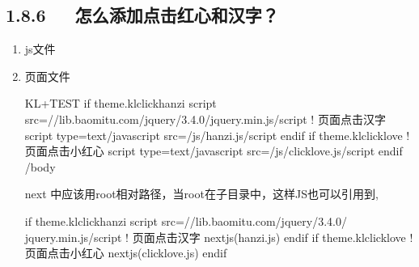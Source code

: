 \documentclass[letterpaper,12pt,english]{sphinxmanual}
\begin{document}
\subsection{1.8.6   怎么添加点击红心和汉字？}
\label{\detokenize{001software/001install/001._u7f51_u7ad9/hexo:id21}}\begin{enumerate}
%
\item {} 
js文件

\begin{sphinxVerbatim}[commandchars=\\\{\}]
\end{sphinxVerbatim}

\item {} 
页面文件

\begin{sphinxVerbatim}[commandchars=\\\{\}]
KL+TEST
\PYGZob{}\PYGZpc{}\PYGZhy{} if theme.kl\PYGZus{}click\PYGZus{}hanzi \PYGZpc{}\PYGZcb{}
      \PYGZlt{}script src=\PYGZdq{}//lib.baomitu.com/jquery/3.4.0/jquery.min.js\PYGZdq{}\PYGZgt{}\PYGZlt{}/script\PYGZgt{}
      \PYGZlt{}!\PYGZhy{}\PYGZhy{} 页面点击汉字 \PYGZhy{}\PYGZhy{}\PYGZgt{}
      \PYGZlt{}script type=\PYGZdq{}text/javascript\PYGZdq{} src=\PYGZdq{}/js/hanzi.js\PYGZdq{}\PYGZgt{}\PYGZlt{}/script\PYGZgt{}
\PYGZob{}\PYGZpc{}\PYGZhy{} endif \PYGZpc{}\PYGZcb{}
\PYGZob{}\PYGZpc{}\PYGZhy{} if theme.kl\PYGZus{}click\PYGZus{}love \PYGZpc{}\PYGZcb{}
      \PYGZlt{}!\PYGZhy{}\PYGZhy{} 页面点击小红心 \PYGZhy{}\PYGZhy{}\PYGZgt{}
      \PYGZlt{}script type=\PYGZdq{}text/javascript\PYGZdq{} src=\PYGZdq{}/js/clicklove.js\PYGZdq{}\PYGZgt{}\PYGZlt{}/script\PYGZgt{}
\PYGZob{}\PYGZpc{}\PYGZhy{} endif \PYGZpc{}\PYGZcb{}
\PYGZlt{}/body\PYGZgt{}
\end{sphinxVerbatim}

next 中应该用root相对路径，当root在子目录中，这样JS也可以引用到, 

\begin{sphinxVerbatim}[commandchars=\\\{\}]
\PYGZob{}\PYGZpc{}\PYGZhy{} if theme.kl\PYGZus{}click\PYGZus{}hanzi \PYGZpc{}\PYGZcb{}
      \PYGZlt{}script src=\PYGZdq{}//lib.baomitu.com/jquery/3.4.0/    jquery.min.js\PYGZdq{}\PYGZgt{}\PYGZlt{}/script\PYGZgt{}
      \PYGZlt{}!\PYGZhy{}\PYGZhy{} 页面点击汉字 \PYGZhy{}\PYGZhy{}\PYGZgt{}
      \PYGZob{}\PYGZob{}\PYGZhy{} next\PYGZus{}js(\PYGZsq{}hanzi.js\PYGZsq{}) \PYGZcb{}\PYGZcb{}
\PYGZob{}\PYGZpc{}\PYGZhy{} endif \PYGZpc{}\PYGZcb{}
\PYGZob{}\PYGZpc{}\PYGZhy{} if theme.kl\PYGZus{}click\PYGZus{}love \PYGZpc{}\PYGZcb{}
      \PYGZlt{}!\PYGZhy{}\PYGZhy{} 页面点击小红心 \PYGZhy{}\PYGZhy{}\PYGZgt{}
      \PYGZob{}\PYGZob{}\PYGZhy{} next\PYGZus{}js(\PYGZsq{}clicklove.js\PYGZsq{}) \PYGZcb{}\PYGZcb{}
\PYGZob{}\PYGZpc{}\PYGZhy{} endif \PYGZpc{}\PYGZcb{}
\end{sphinxVerbatim}


\end{enumerate}
\end{document}
